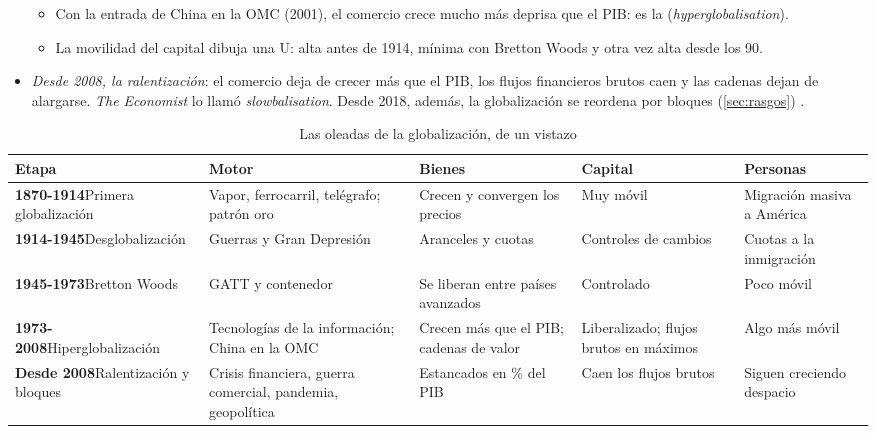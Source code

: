 \documentclass[11pt]{article}
\begin{document}
\begin{itemize}
  \begin{itemize}
  \item Con la entrada de China en la OMC (2001), el comercio crece mucho más deprisa que el PIB: es la  (\emph{hyperglobalisation})\nocite{SubramanianKessler2013}.
  \item La movilidad del capital dibuja una U: alta antes de 1914, mínima con Bretton Woods y otra vez alta desde los 90\nocite{ObstfeldTaylor2004Global}.
  \end{itemize}
\item \emph{Desde 2008, la ralentización}: el comercio deja de crecer más que el PIB, los flujos financieros brutos caen y las cadenas dejan de alargarse. \emph{The Economist} lo llamó \emph{slowbalisation}\nocite{Economist2019Slowbalisation}. Desde 2018, además, la globalización se reordena por bloques (\ref{sec:rasgos}) .
\end{itemize}

\begin{table}[H]
\centering
\caption{Las oleadas de la globalización, de un vistazo}\label{tab:oleadas}
\small
\begin{tabular}{>{\raggedright\arraybackslash}m{3.0cm}>{\raggedright\arraybackslash}m{2.7cm}>{\raggedright\arraybackslash}m{2.5cm}>{\raggedright\arraybackslash}m{2.5cm}>{\raggedright\arraybackslash}m{2.5cm}}
\toprule
\rowcolor{tceeazulpalido} Etapa & Motor & Bienes & Capital & Personas \\
\midrule
\textbf{1870-1914}\newline Primera globalización & Vapor, ferrocarril, telégrafo; patrón oro & Crecen y convergen los precios & Muy móvil & Migración masiva a América \\
\addlinespace
\textbf{1914-1945}\newline Desglobalización & Guerras y Gran Depresión & Aranceles y cuotas & Controles de cambios & Cuotas a la inmigración \\
\addlinespace
\textbf{1945-1973}\newline Bretton Woods & GATT y contenedor & Se liberan entre países avanzados & Controlado & Poco móvil \\
\addlinespace
\textbf{1973-2008}\newline Hiperglobalización & Tecnologías de la información; China en la OMC & Crecen más que el PIB; cadenas de valor & Liberalizado; flujos brutos en máximos & Algo más móvil \\
\addlinespace
\textbf{Desde 2008}\newline Ralentización y bloques & Crisis financiera, guerra comercial, pandemia, geopolítica & Estancados en \% del PIB & Caen los flujos brutos & Siguen creciendo despacio \\
\bottomrule
\end{tabular}
\end{table}
\end{document}
